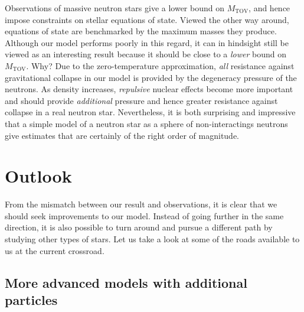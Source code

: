 Observations of massive neutron stars give a lower bound on $M_\text{TOV}$, and hence impose constraints on stellar equations of state.
Viewed the other way around, equations of state are benchmarked by the maximum masses they produce.
Although our model performs poorly in this regard, it can in hindsight still be viewed as an interesting result because it should be close to a \emph{lower} bound on $M_\text{TOV}$.
Why?
Due to the zero-temperature approximation, \emph{all} resistance against gravitational collapse in our model is provided by the degeneracy pressure of the neutrons.
As density increases, \emph{repulsive} nuclear effects become more important and should provide \emph{additional} pressure and hence greater resistance against collapse in a real neutron star. \cite[section 3.9.8]{ref:glendenning}
Nevertheless, it is both surprising and impressive that a simple model of a neutron star as a sphere of non-interactings neutrons give estimates that are certainly of the right order of magnitude.

\section{Outlook}

From the mismatch between our result and observations, it is clear that we should seek improvements to our model.
Instead of going further in the same direction, it is also possible to turn around and pursue a different path by studying other types of stars.
Let us take a look at some of the roads available to us at the current crossroad.

\iffalse
\subsection*{Renormalization}

When we encountered infinite vacuum contributions to the energy density and pressure, we simply argued that they were unphysical and ignored them.
A more precise treatment would be to allow for additional self-interactions in the Dirac Lagrangian \eqref{eq:tft:dirac_lagrangian}, hence renormalizing the neutron mass $m$, modifying the equation of state and ultimately the mass-radius curve.
\TODO{is this correct? is the effect small?}
\TODO{is this really significant, or should i just drop it?}
\fi

\subsection*{More advanced models with additional particles}

